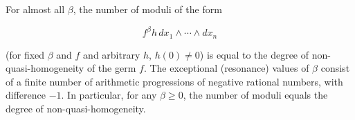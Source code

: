For almost all $\beta$, the number of moduli of the form

$$f^\beta h \, dx_1 \wedge \cdots \wedge dx_n$$

(for fixed $\beta$ and $f$ and arbitrary $h$, $h(0) \neq 0$) is equal to the degree of non-quasi-homogeneity of the germ $f$. The exceptional (resonance) values of $\beta$ consist of a finite number of arithmetic progressions of negative rational numbers, with difference $-1$. In particular, for any $\beta \geq 0$, the number of moduli equals the degree of non-quasi-homogeneity.
